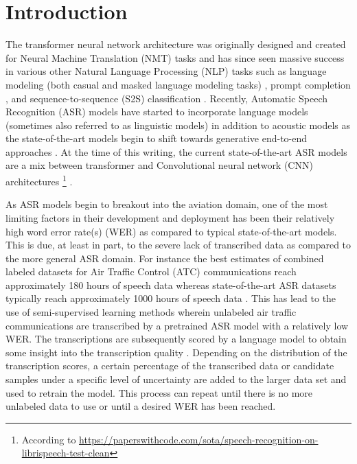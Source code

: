 \documentclass[10pt]{article}
\begin{document}
    \section{Introduction}
        The transformer neural network architecture was originally designed and created for Neural Machine
        Translation (NMT) tasks \cite{vaswani_attention_2017} and has since seen massive success in various
        other Natural Language Processing (NLP) tasks such as language modeling (both casual and masked language
        modeling tasks) \cite{devlin_bert_2019}, prompt completion \cite{radford_improving_2018}, and
        sequence-to-sequence (S2S) classification \cite{lewis_bart_2019}.
        Recently, Automatic Speech Recognition (ASR) models have started to incorporate language models
        \cite{badrinath_automatic_2022} (sometimes also referred to as linguistic models) in addition to
        acoustic models \cite{li_jasper_2019} as the state-of-the-art models begin to shift towards generative
        end-to-end approaches \cite{hannun_deep_2014}.
        At the time of this writing, the current state-of-the-art ASR models are a mix between transformer
        and Convolutional neural network (CNN) architectures
        \footnote{According to \url{https://paperswithcode.com/sota/speech-recognition-on-librispeech-test-clean}}
        \cite{baevski_wav2vec_2020}.


        As ASR models begin to breakout into the aviation domain, one of the most limiting factors in their
        development and deployment has been their relatively high word error rate(s) (WER)
        \cite{smidl_air_2019,zuluaga-gomez_automatic_2020,badrinath_automatic_2022} as compared to typical state-of-the-art models.
        This is due, at least in part, to the severe lack of transcribed data as compared to the more general ASR domain.
        For instance the best estimates of combined labeled datasets for Air Traffic Control (ATC)
        communications reach approximately 180 hours of speech data \cite{zuluaga-gomez_automatic_2020} whereas
        state-of-the-art ASR datasets typically reach approximately 1000 hours of speech data \cite{panayotov_librispeech_2015}.
        This has lead to the use of semi-supervised learning methods wherein unlabeled air
        traffic communications are transcribed by a pretrained ASR model with a relatively low WER.
        The transcriptions are subsequently scored by a language model to obtain some insight into the
        transcription quality \cite{badrinath_automatic_2022,zuluaga-gomez_contextual_2021}.
        Depending on the distribution of the transcription scores, a certain percentage of the transcribed data or candidate
        samples under a specific level of uncertainty are added to the larger data set and used to retrain the model. This
        process can repeat until there is no more unlabeled data to use or until a desired WER has been reached.
\end{document}
